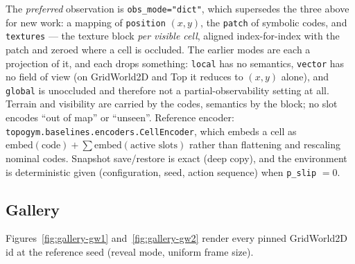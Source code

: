 \documentclass[11pt]{article}
\begin{document}
The \emph{preferred} observation is \texttt{obs\_mode="dict"}, which
supersedes the three above for new work: a mapping of
\texttt{position} $(x, y)$, the \texttt{patch} of symbolic codes, and
\texttt{textures} --- the texture block \emph{per visible cell},
aligned index-for-index with the patch and zeroed where a cell is
occluded. The earlier modes are each a projection of it, and each
drops something: \texttt{local} has no semantics, \texttt{vector} has
no field of view (on GridWorld2D and Top it reduces to $(x, y)$
alone), and \texttt{global} is unoccluded and therefore not a
partial-observability setting at all. Terrain and visibility are
carried by the codes, semantics by the block; no slot encodes ``out of
map'' or ``unseen''. Reference encoder:
\texttt{topogym.baselines.encoders.CellEncoder}, which embeds a cell
as $\mathrm{embed}(\text{code}) + \sum \mathrm{embed}(\text{active
slots})$ rather than flattening and rescaling nominal codes.
Snapshot save/restore is exact (deep copy), and the
environment is deterministic given (configuration, seed, action
sequence) when \texttt{p\_slip} $= 0$.

\subsection{Gallery}

Figures~\ref{fig:gallery-gw1} and~\ref{fig:gallery-gw2} render every pinned GridWorld2D id at the reference seed (reveal mode, uniform frame size).
\end{document}
